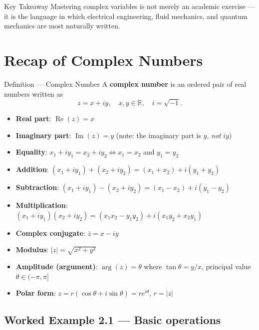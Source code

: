 \documentclass[12pt,a4paper]{article}
\begin{document}
\begin{learnbox}{Key Takeaway}
Mastering complex variables is not merely an academic exercise --- it is the
language in which electrical engineering, fluid mechanics, and quantum
mechanics are most naturally written.
\end{learnbox}

\section{Recap of Complex Numbers}

\begin{infobox}{Definition --- Complex Number}
A \textbf{complex number} is an ordered pair of real numbers written as
\[
  z = x + iy, \quad x,y \in \mathbb{R},\quad i = \sqrt{-1}.
\]
\begin{itemize}[noitemsep]
  \item \textbf{Real part}: \(\operatorname{Re}(z) = x\)
  \item \textbf{Imaginary part}: \(\operatorname{Im}(z) = y\)
        \quad (note: the imaginary part is \(y\), \emph{not} \(iy\))
  \item \textbf{Equality}: \(x_1+iy_1 = x_2+iy_2 \iff x_1=x_2\) and
        \(y_1=y_2\)
  \item \textbf{Addition}: \((x_1+iy_1)+(x_2+iy_2)=(x_1+x_2)+i(y_1+y_2)\)
  \item \textbf{Subtraction}: \((x_1+iy_1)-(x_2+iy_2)=(x_1-x_2)+i(y_1-y_2)\)
  \item \textbf{Multiplication}:
        \((x_1+iy_1)(x_2+iy_2)=(x_1 x_2 - y_1 y_2)+i(x_1 y_2+x_2 y_1)\)
  \item \textbf{Complex conjugate}: \(\overline{z} = x - iy\)
  \item \textbf{Modulus}: \(|z| = \sqrt{x^2+y^2}\)
  \item \textbf{Amplitude (argument)}: \(\arg(z) = \theta\) where
        \(\tan\theta = y/x\), principal value \(\theta \in (-\pi,\pi]\)
  \item \textbf{Polar form}:
        \(z = r(\cos\theta + i\sin\theta) = re^{i\theta}\), \quad \(r=|z|\)
\end{itemize}
\end{infobox}

\subsection*{Worked Example 2.1 --- Basic operations}
\end{document}
